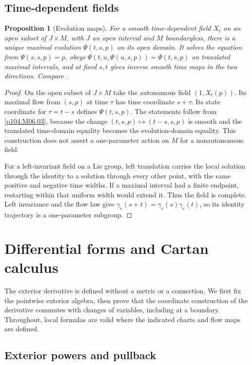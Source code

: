 \documentclass[11pt,oneside,openany]{book}
\newtheorem{proposition}[theorem]{Proposition}
\theoremstyle{definition}
\theoremstyle{remark}
\begin{document}
\section{Time-dependent fields}

\begin{proposition}[Evolution maps]\label{p104:M06.08}
For a smooth time-dependent field \(X_t\) on an open subset of \(J\times M\), with \(J\) an open interval and \(M\) boundaryless, there is a unique maximal evolution \(\Psi(t,s,p)\) on its open domain. It solves the equation from \(\Psi(s,s,p)=p\), obeys \(\Psi(t,u,\Psi(u,s,p))=\Psi(t,s,p)\) on translated maximal intervals, and at fixed \(s,t\) gives inverse smooth time maps in the two directions. Compare \cite[Theorem 9.48]{lee}.
\end{proposition}
\begin{proof}
On the open subset of \(J\times M\) take the autonomous field \((1,X_t(p))\). Its maximal flow from \((s,p)\) at time \(\tau\) has time coordinate \(s+\tau\). Its state coordinate for \(\tau=t-s\) defines \(\Psi(t,s,p)\). The statements follow from \cref{p104:M06.03}, because the change \((t,s,p)\mapsto(t-s,s,p)\) is smooth and the translated time-domain equality becomes the evolution-domain equality. This construction does not assert a one-parameter action on \(M\) for a nonautonomous field.

For a left-invariant field on a Lie group, left translation carries the local solution through the identity to a solution through every other point, with the same positive and negative time widths. If a maximal interval had a finite endpoint, restarting within that uniform width would extend it. Thus the field is complete. Left invariance and the flow law give \(\gamma_e(s+t)=\gamma_e(s)\gamma_e(t)\), so its identity trajectory is a one-parameter subgroup.
\end{proof}
\chapter{Differential forms and Cartan calculus}

The exterior derivative is defined without a metric or a connection. We first fix the pointwise exterior algebra, then prove that the coordinate construction of the derivative commutes with changes of variables, including at a boundary. Throughout, local formulas are valid where the indicated charts and flow maps are defined.

\section{Exterior powers and pullback}
\end{document}
